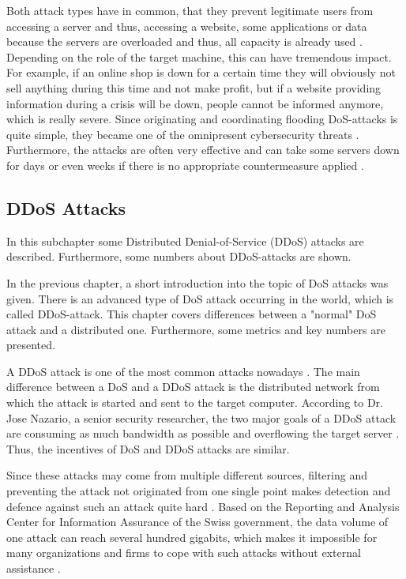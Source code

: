 Both attack types have in common, that they prevent legitimate users from accessing a server and thus, accessing a website, some applications or data because the servers are overloaded and thus, all capacity is already used  \cite{DoS-Norton, DoS-Comparitech}. Depending on the role of the target machine, this can have tremendous impact. For example, if an online shop is down for a certain time they will obviously not sell anything during this time and not make profit, but if a website providing information during a crisis will be down, people cannot be informed anymore, which is really severe. Since originating and coordinating flooding DoS-attacks is quite simple, they became one of the omnipresent cybersecurity threats \cite{DoS-Comparitech}. Furthermore, the attacks are often very effective and can take some servers down for days or even weeks if there is no appropriate countermeasure applied \cite{DoS-Comparitech}. 

\subsection{DDoS Attacks}
In this subchapter some Distributed Denial-of-Service (DDoS) attacks are described. Furthermore, some numbers about DDoS-attacks are shown.

In the previous chapter, a short introduction into the topic of DoS attacks was given. There is an advanced type of DoS attack occurring in the world, which is called DDoS-attack. This chapter covers differences between a "normal" DoS attack and a distributed one. Furthermore, some metrics and key numbers are presented. 

A DDoS attack is one of the most common attacks nowadays \cite{DoS-Comparitech}. The main difference between a DoS and a DDoS attack is the distributed network from which the attack is started and sent to the target computer. According to Dr. Jose Nazario, a senior security researcher, the two major goals of a DDoS attack are consuming as much bandwidth as possible and overflowing the target server \cite{nazario2008ddos}. Thus, the incentives of DoS and DDoS attacks are similar. 

Since these attacks may come from multiple different sources, filtering and preventing the attack not originated from one single point makes detection and defence against such an attack quite hard \cite{nazario2008ddos}. Based on the Reporting and Analysis Center for Information Assurance of the Swiss government, the data volume of one attack can reach several hundred gigabits, which makes it impossible for many organizations and firms to cope with such attacks without external assistance \cite{DDoS-MELANI}.

